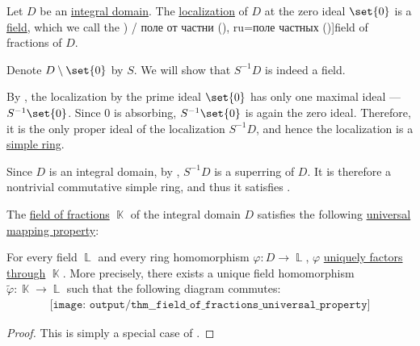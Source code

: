 \begin{definition}\label{def:field_of_fractions}
  Let \( D \) be an \hyperref[def:integral_domain]{integral domain}. The \hyperref[def:ring_localization]{localization} of \( D \) at the zero ideal \( \set{ 0 } \) is a \hyperref[def:field]{field}, which we call the \term[bg=поле на отношенията (\cite[399]{Обрешков1962ВисшаАлгебра}) / поле от частни (\cite[def. V.16]{ГеновМиховскиМоллов1991Алгебра}), ru=поле частных (\cite[26]{Шафаревич1999ОсновныеПонятияАлгебры})]{field of fractions} of \( D \).
\end{definition}
\begin{defproof}
  Denote \( D \setminus \set{ 0 } \) by \( S \). We will show that \( S^{-1} D \) is indeed a field.

  By , the localization by the prime ideal \( \set{ 0 } \) has only one maximal ideal --- \( S^{-1} \set{ 0 } \). Since \( 0 \) is absorbing, \( S^{-1} \set{ 0 } \) is again the zero ideal. Therefore, it is the only proper ideal of the localization \( S^{-1} D \), and hence the localization is a \hyperref[def:simple_object]{simple ring}.

  Since \( D \) is an integral domain, by , \( S^{-1} D \) is a superring of \( D \). It is therefore a nontrivial commutative simple ring, and thus it satisfies .
\end{defproof}

\begin{theorem}\label{def:field_of_fractions_universal_property}
  The \hyperref[def:field_of_fractions]{field of fractions} \( \BbbK \) of the integral domain \( D \) satisfies the following \hyperref[rem:universal_mapping_property]{universal mapping property}:
  \begin{displayquote}
    For every field \( \BbbL \) and every ring homomorphism \( \varphi: D \to \BbbL \), \( \varphi \) \hyperref[def:factors_through]{uniquely factors through} \( \BbbK \). More precisely, there exists a unique field homomorphism \( \widetilde{\varphi}: \BbbK \to \BbbL \) such that the following diagram commutes:
    \begin{equation}\label{eq:def:field_of_fractions_universal_property/diagram}
      \begin{aligned}
        \texttt{[image: output/thm\_\_field\_of\_fractions\_universal\_property]}
      \end{aligned}
    \end{equation}
  \end{displayquote}
\end{theorem}
\begin{proof}
  This is simply a special case of .
\end{proof}

